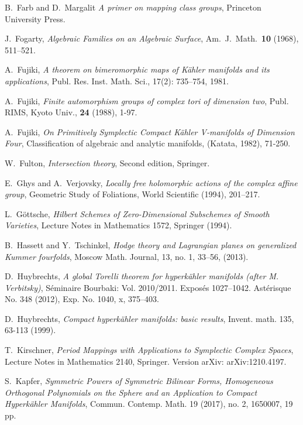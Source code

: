 \begin{thebibliography}{10}
B.~Farb and D.~Margalit \emph{A primer on mapping class groups}, Princeton University Press.

J.~Fogarty, \emph{Algebraic Families on an Algebraic Surface},
  Am.~J.~Math.~\textbf{10} (1968), 511--521.

A.~Fujiki,
\emph{A theorem on bimeromorphic maps of K\"ahler manifolds and its applications},
Publ. Res. Inst. Math. Sci., 
17(2): 735--754, 1981.

A.~Fujiki, \emph{Finite automorphism groups of complex tori of dimension two}, Publ. RIMS,
  Kyoto Univ., \textbf{24} (1988), 1-97.

A.~Fujiki,
\emph{On Primitively Symplectic Compact K\"ahler V-manifolds of Dimension Four},
Classification of algebraic and analytic manifolds, 
(Katata, 1982), 71-250.

W.~Fulton,
\emph{Intersection theory},
Second edition, Springer.

E.~Ghys and A.~Verjovsky, \emph{Locally free holomorphic actions of the complex affine group},
  Geometric Study of Foliations, World Scientific (1994), 201--217.

L.~G\"ottsche, \emph{Hilbert Schemes of Zero-Dimensional Subschemes of Smooth Varieties},
  Lecture Notes in Mathematics 1572, Springer (1994).

B.~Hassett and Y.~Tschinkel, \emph{ Hodge theory and Lagrangian planes on 
  generalized Kummer fourfolds}, Moscow Math. Journal, 13, no. 1, 33--56, (2013).

D.~Huybrechts,
\emph{A global Torelli theorem for hyperk\"ahler manifolds (after M. Verbitsky)},
Séminaire Bourbaki: Vol. 2010/2011. Exposés 1027–1042. Astérisque No. 348 (2012), Exp. No. 1040, x, 375–403.

D.~Huybrechts,
\emph{ Compact hyperk\"ahler manifolds: basic results},
Invent. math. 
135, 63-113 (1999).

T.~Kirschner, 
\emph{Period Mappings with Applications to Symplectic Complex Spaces},
Lecture Notes in Mathematics 2140, Springer.
Version arXiv: arXiv:1210.4197.
  
S.~Kapfer, \emph{Symmetric Powers of Symmetric Bilinear Forms, Homogeneous Orthogonal Polynomials 
  on the Sphere and an Application to Compact Hyperk\"ahler Manifolds},
Commun. Contemp. Math. 19 (2017), no. 2, 1650007, 19 pp.   
  

\end{thebibliography}
